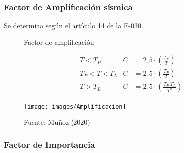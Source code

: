 \documentclass{article}%
\begin{document}
\subsubsection{Factor de Amplificación sísmica}%
\label{ssubsec:FactordeAmplificacinssmica}%
Se determina según el artículo 14 de la E{-}030.%
\setlength{\jot}{0.5cm}%


\begin{figure}[h!]%
\caption{Factor de amplificación}%
\begin{minipage}{0.5\textwidth}%

    \begin{align*}
        &T< T_{P}         &   C&=2,5\cdot\left ( \frac{T_{P}}{T} \right )\\
        &T_{P}< T< T_{L}  &   C&=2,5\cdot\left ( \frac{T_{P}}{T} \right )\\
        &T> T_{L}         &   C&=2,5\cdot\left ( \frac{T_{P}\;T_{L}}{T^{2}} \right )
    \end{align*}%
\end{minipage}%
\begin{minipage}{0.4\textwidth}%
\centering%
\texttt{[image: images/Amplificacion]}%
\end{minipage}%
\caption*{Fuente: Muñoz (2020)}%
\end{figure}

%
\subsubsection{Factor de Importancia}%
\label{ssubsec:FactordeImportancia}%
\end{document}

